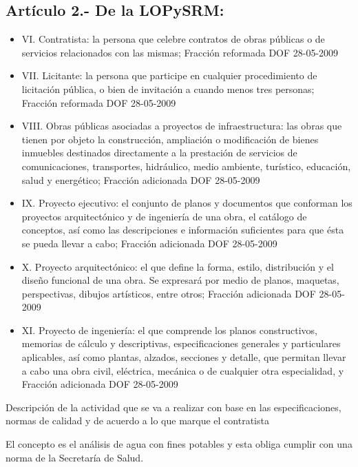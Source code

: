 \subsection{Artículo 2.- De la LOPySRM:}
\begin{itemize}
    \item VI. Contratista: la persona que celebre contratos de obras públicas o de servicios relacionados con las mismas; Fracción reformada DOF 28-05-2009
    \item VII. Licitante: la persona que participe en cualquier procedimiento de licitación pública, o bien de invitación a cuando menos tres personas; Fracción reformada DOF 28-05-2009
    \item VIII. Obras públicas asociadas a proyectos de infraestructura: las obras que tienen por objeto la construcción, ampliación o modificación de bienes inmuebles destinados directamente a la prestación de servicios de comunicaciones, transportes, hidráulico, medio ambiente, turístico, educación, salud y energético; Fracción adicionada DOF 28-05-2009
    \item IX. Proyecto ejecutivo: el conjunto de planos y documentos que conforman los proyectos arquitectónico y de ingeniería de una obra, el catálogo de conceptos, así como las descripciones e información suficientes para que ésta se pueda llevar a cabo; Fracción adicionada DOF 28-05-2009
    \item X. Proyecto arquitectónico: el que define la forma, estilo, distribución y el diseño funcional de una obra. Se expresará por medio de planos, maquetas, perspectivas, dibujos artísticos, entre otros; Fracción adicionada DOF 28-05-2009
    \item XI. Proyecto de ingeniería: el que comprende los planos constructivos, memorias de cálculo y descriptivas, especificaciones generales y particulares aplicables, así como plantas, alzados, secciones y detalle, que permitan llevar a cabo una obra civil, eléctrica, mecánica o de cualquier otra especialidad, y Fracción adicionada DOF 28-05-2009
\end{itemize}
\begin{definition}
    Descripción de la actividad que se va a realizar con base en las especificaciones, normas de calidad y de acuerdo a lo que marque el contratista
\end{definition}

El concepto es el análisis de agua con fines potables y esta obliga cumplir con una norma de la Secretaría de Salud.

